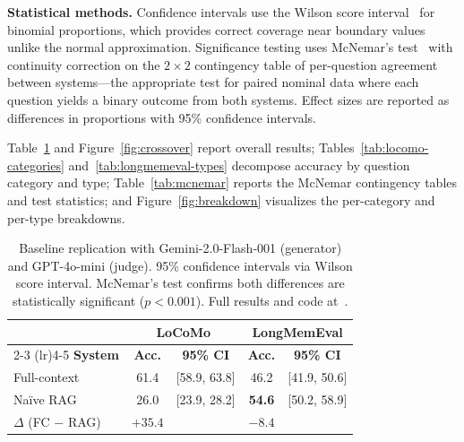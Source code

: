 \smallskip
\noindent\textbf{Statistical methods.}\enspace
Confidence intervals use the Wilson score interval~\cite{wilson1927} for
binomial proportions, which provides correct coverage near boundary values
unlike the normal approximation.  Significance testing uses McNemar's
test~\cite{mcnemar1947} with continuity correction on the $2 \times 2$
contingency table of per-question agreement between systems---the appropriate
test for paired nominal data where each question yields a binary outcome from
both systems.  Effect sizes are reported as differences in proportions with
95\% confidence intervals.

Table~\ref{tab:our-baselines} and Figure~\ref{fig:crossover} report overall
results; Tables~\ref{tab:locomo-categories} and~\ref{tab:longmemeval-types}
decompose accuracy by question category and type;
Table~\ref{tab:mcnemar} reports the McNemar contingency tables and test
statistics; and Figure~\ref{fig:breakdown} visualizes the per-category and
per-type breakdowns.

\begin{table}[!t]
\centering
\caption{Baseline replication with Gemini-2.0-Flash-001 (generator) and
GPT-4o-mini (judge).  95\% confidence intervals via Wilson score interval.
McNemar's test confirms both differences are statistically significant
($p < 0.001$).  Full results and code at~\cite{alaya2026}.}
\label{tab:our-baselines}
\small
\begin{tabular}{@{}lcccc@{}}
\toprule
& \multicolumn{2}{c}{\textbf{LoCoMo}} & \multicolumn{2}{c}{\textbf{LongMemEval}} \\
\cmidrule(lr){2-3} \cmidrule(lr){4-5}
\textbf{System} & \textbf{Acc.} & \textbf{95\% CI} & \textbf{Acc.} & \textbf{95\% CI} \\
\midrule
Full-context & 61.4 & [58.9, 63.8] & 46.2 & [41.9, 50.6] \\
Na\"ive RAG  & 26.0 & [23.9, 28.2] & \textbf{54.6} & [50.2, 58.9] \\
\midrule
$\Delta$ (FC $-$ RAG) & $+35.4$ & & $-8.4$ & \\
\bottomrule
\end{tabular}
\end{table}

